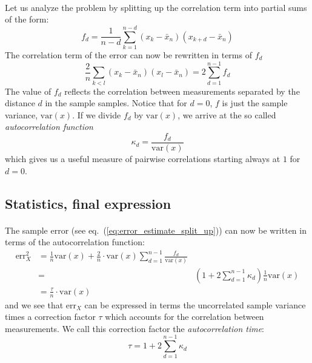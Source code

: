 \documentclass[%
oneside,                 %
final,                   %
10pt]{article}
\begin{document}
\paragraph{}
Let us analyze the problem by splitting up the correlation term into
partial sums of the form:
\[
f_d = \frac{1}{n-d}\sum_{k=1}^{n-d}(x_k - \bar x_n)(x_{k+d} - \bar x_n)
\]
The correlation term of the error can now be rewritten in terms of
$f_d$
\[
\frac{2}{n}\sum_{k<l} (x_k - \bar x_n)(x_l - \bar x_n) =
2\sum_{d=1}^{n-1} f_d
\]
The value of $f_d$ reflects the correlation between measurements
separated by the distance $d$ in the sample samples.  Notice that for
$d=0$, $f$ is just the sample variance, $\mathrm{var}(x)$. If we divide $f_d$
by $\mathrm{var}(x)$, we arrive at the so called \emph{autocorrelation function}
\[
\kappa_d = \frac{f_d}{\mathrm{var}(x)}
\]
which gives us a useful measure of pairwise correlations
starting always at $1$ for $d=0$.



\subsection*{Statistics, final expression}

\paragraph{}
The sample error (see eq.~(\ref{eq:error_estimate_split_up})) can now be
written in terms of the autocorrelation function:
\begin{align}
\mathrm{err}_X^2 &=
\frac{1}{n}\mathrm{var}(x)+\frac{2}{n}\cdot\mathrm{var}(x)\sum_{d=1}^{n-1}
\frac{f_d}{\mathrm{var}(x)}\nonumber\\ &=&
\left(1+2\sum_{d=1}^{n-1}\kappa_d\right)\frac{1}{n}\mathrm{var}(x)\nonumber\\
&=\frac{\tau}{n}\cdot\mathrm{var}(x)
\label{eq:error_estimate_corr_time}
\end{align}
and we see that $\mathrm{err}_X$ can be expressed in terms the
uncorrelated sample variance times a correction factor $\tau$ which
accounts for the correlation between measurements. We call this
correction factor the \emph{autocorrelation time}:
\begin{equation}
\tau = 1+2\sum_{d=1}^{n-1}\kappa_d
\label{eq:autocorrelation_time}
\end{equation}
\end{document}
